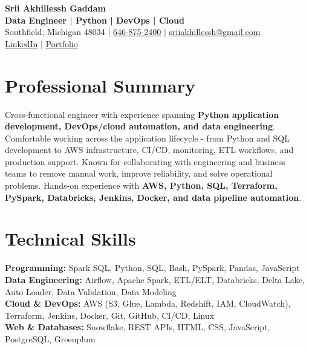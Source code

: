 \documentclass[letterpaper,10pt]{article}
\begin{document}
\fontsize{9.35pt}{10.45pt}\selectfont

\begin{center}
    {\LARGE \textbf{Srii Akhillessh Gaddam}} \\[-1pt]
    \textbf{Data Engineer | Python | DevOps | Cloud} \\[2pt]
    Southfield, Michigan 48034 $|$
    \href{tel:6468752400}{646-875-2400} $|$
    \href{mailto:sriiakhillessh@gmail.com}{sriiakhillessh@gmail.com} \\[1pt]
    \href{https://www.linkedin.com/in/srii-akhiilessh-gaddam-b48668191/}{LinkedIn} $|$
    \href{https://sriiakhillesshg.github.io/portfolio/}{Portfolio}
\end{center}
\vspace{-8pt}

\section{Professional Summary}
\small{Cross-functional engineer with experience spanning \textbf{Python application development, DevOps/cloud automation, and data engineering}. Comfortable working across the application lifecycle - from Python and SQL development to AWS infrastructure, CI/CD, monitoring, ETL workflows, and production support. Known for collaborating with engineering and business teams to remove manual work, improve reliability, and solve operational problems. Hands-on experience with \textbf{AWS, Python, SQL, Terraform, PySpark, Databricks, Jenkins, Docker, and data pipeline automation}.}

\section{Technical Skills}
\small{
\textbf{Programming:} Spark SQL, Python, SQL, Bash, PySpark, Pandas, JavaScript \\
\textbf{Data Engineering:} Airflow, Apache Spark, ETL/ELT, Databricks, Delta Lake, Auto Loader, Data Validation, Data Modeling \\
\textbf{Cloud \& DevOps:} AWS (S3, Glue, Lambda, Redshift, IAM, CloudWatch), Terraform, Jenkins, Docker, Git, GitHub, CI/CD, Linux \\
\textbf{Web \& Databases:} Snowflake, REST APIs, HTML, CSS, JavaScript, PostgreSQL, Greenplum
}

\end{document}
